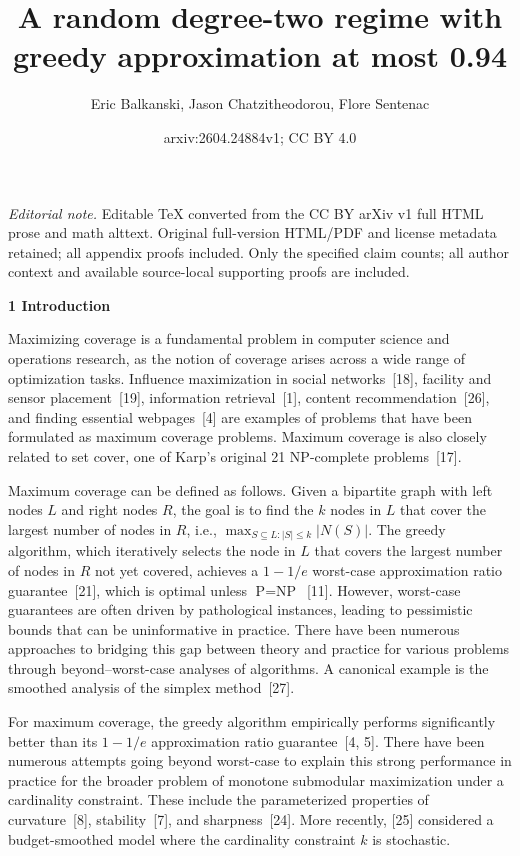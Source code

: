 \documentclass[10pt,a4paper]{article}
\title{A random degree-two regime with greedy approximation at most 0.94}
\author{Eric Balkanski, Jason Chatzitheodorou, Flore Sentenac}
\date{arxiv:2604.24884v1; CC BY 4.0}
\begin{document}
\maketitle
\noindent\textit{Editorial note.} Editable TeX converted from the CC BY arXiv v1 full HTML prose and math alttext. Original full-version HTML/PDF and license metadata retained; all appendix proofs included. Only the specified claim counts; all author context and available source-local supporting proofs are included.\par\medskip


\par\medskip\noindent\textbf{1 Introduction}\par




Maximizing coverage is a fundamental problem in computer science and operations research, as the notion of coverage arises across a wide range of optimization tasks. Influence maximization in social networks [18], facility and sensor placement [19], information retrieval [1], content recommendation [26], and finding essential webpages [4] are examples of problems that have been formulated as maximum coverage problems. Maximum coverage is also closely related to set cover, one of Karp’s original 21 NP-complete problems [17].\par




Maximum coverage can be defined as follows. Given a bipartite graph with left nodes $L$ and right nodes $R$, the goal is to find the $k$ nodes in $L$ that cover the largest number of nodes in $R$, i.e., $\max_{S\subseteq L:|S|\leq k}|N(S)|$.
The greedy algorithm, which iteratively selects the node in $L$ that covers the largest number of nodes in $R$ not yet covered, achieves a $1-1/e$ worst-case approximation ratio guarantee [21], which is optimal unless $\text{P}=\text{NP}$ [11]. However, worst-case guarantees are often driven by pathological instances, leading to pessimistic bounds that can be uninformative in practice. There have been numerous approaches to bridging this gap between theory and practice for various problems through beyond–worst-case analyses of algorithms. A canonical example is the smoothed analysis of the simplex method [27].\par




For maximum coverage, the greedy algorithm empirically performs significantly better than its $1-1/e$
approximation ratio guarantee [4, 5]. There have been numerous attempts going beyond worst-case to explain this strong performance in practice for the broader problem of monotone submodular maximization under a cardinality constraint. These include the parameterized properties of curvature [8], stability [7], and sharpness [24]. More recently, [25] considered a budget-smoothed model where the cardinality constraint $k$ is stochastic.\par
\end{document}
